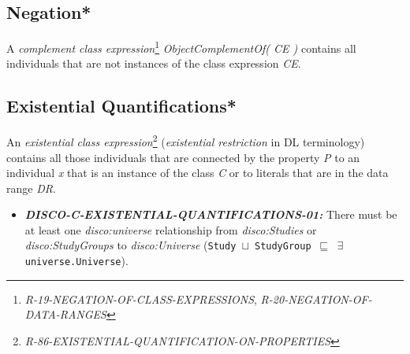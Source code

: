 \documentclass{llncs}
\newcommand{\ms}[1]{\texttt{#1}}
\begin{document}
\subsection{Negation*}

A \emph{complement class expression}\footnote{\emph{R-19-NEGATION-OF-CLASS-EXPRESSIONS}, \emph{R-20-NEGATION-OF-DATA-RANGES}} \emph{ObjectComplementOf( CE )} contains all individuals that are not instances of the class expression \emph{CE}. 

\subsection{Existential Quantifications*}

An \emph{existential class expression}\footnote{{\em R-86-EXISTENTIAL-QUANTIFICATION-ON-PROPERTIES}} ({\em existential restriction} in DL terminology) contains all those individuals that are connected by the property \emph{P} to an individual \emph{x} that is an instance of the class \emph{C} or to literals that are in the data range \emph{DR}.

\begin{itemize}
	\item \textbf{{\em DISCO-C-EXISTENTIAL-QUANTIFICATIONS-01:}} 
There must be at least one {\em disco:universe} relationship from {\em disco:Studies} or {\em disco:StudyGroups} to {\em disco:Universe} (\ms{Study $\sqcup$ StudyGroup $\sqsubseteq$ $\exists$ universe.Universe}).
\end{itemize}
\end{document}
